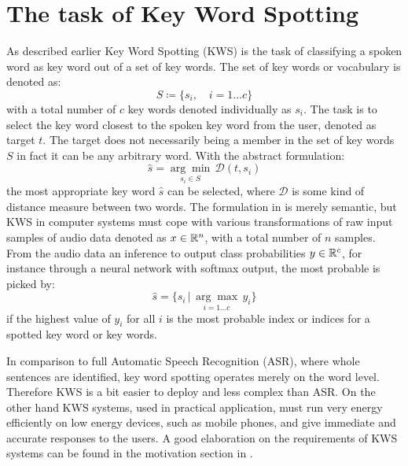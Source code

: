
\section{The task of Key Word Spotting}\label{sec:intro_kws}
\thesisStateReady
As described earlier Key Word Spotting (KWS) is the task of classifying a spoken word as key word out of a set of key words.
The set of key words or vocabulary is denoted as:
\begin{equation}\label{eq:intro_kws_dict}
	S \coloneqq \{s_i, \quad i=1 \dots c\}
\end{equation}
with a total number of $c$ key words denoted individually as $s_i$.
The task is to select the key word closest to the spoken key word from the user, denoted as target $t$.
The target does not necessarily being a member in the set of key words $S$ in fact it can be any arbitrary word.
With the abstract formulation:
\begin{equation}\label{eq:intro_kws_task}
	\hat{s} = \underset{s_i \in S}{\arg \min} \, \mathcal{D}(t, s_i)
\end{equation}
the most appropriate key word $\hat{s}$ can be selected, where $\mathcal{D}$ is some kind of distance measure between two words.
The formulation in  is merely semantic, but KWS in computer systems must cope with various transformations of raw input samples of audio data denoted as $x \in \mathbb{R}^n$, with a total number of $n$ samples.
From the audio data an inference to output class probabilities $y \in \mathbb{R}^c$, for instance through a neural network with softmax output, the most probable is picked by:
\begin{equation}\label{eq:intro_kws_class}
	\hat{s} = \{s_i \, | \, \underset{i = 1 \dots c}{\arg \max} \, y_i\}
\end{equation}
if the highest value of $y_i$ for all $i$ is the most probable index or indices for a spotted key word or key words.

In comparison to full Automatic Speech Recognition (ASR), where whole sentences are identified, key word spotting operates merely on the word level.
Therefore KWS is a bit easier to deploy and less complex than ASR.
On the other hand KWS systems, used in practical application, must run very energy efficiently on low energy devices, such as mobile phones, and give immediate and accurate responses to the users. 
A good elaboration on the requirements of KWS systems can be found in the motivation section in \cite{Warden2018}.


